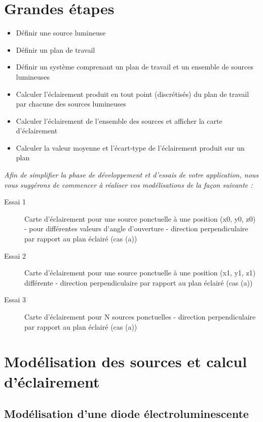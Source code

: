 \section{Grandes étapes}

\begin{itemize}
	\item Définir une source lumineuse
	\item Définir un plan de travail
	\item Définir un système comprenant un plan de travail et un ensemble de sources lumineuses
	\item Calculer l'éclairement produit en tout point (discrétisés) du plan de travail par chacune des sources lumineuses
	\item Calculer l'éclairement de l'ensemble des sources et afficher la carte d'éclairement
	\item Calculer la valeur moyenne et l'écart-type de l'éclairement produit sur un plan
\end{itemize}

\medskip

\textit{Afin de simplifier la phase de développement et d'essais de votre application, nous vous suggérons de commencer à réaliser vos modélisations de la façon suivante : }

\begin{description}
	\item[Essai 1] Carte d'éclairement pour une source ponctuelle à une position (x0, y0, z0) - pour différentes valeurs d'angle d'ouverture - direction perpendiculaire par rapport au plan éclairé (cas (a))
	\item[Essai 2] Carte d'éclairement pour une source ponctuelle à une position (x1, y1, z1) différente  - direction perpendiculaire par rapport au plan éclairé (cas (a))
	\item[Essai 3] Carte d'éclairement pour N sources ponctuelles - direction perpendiculaire par rapport au plan éclairé (cas (a))
\end{description}

\section{Modélisation des sources et calcul d'éclairement}

\subsection{Modélisation d'une diode électroluminescente}


